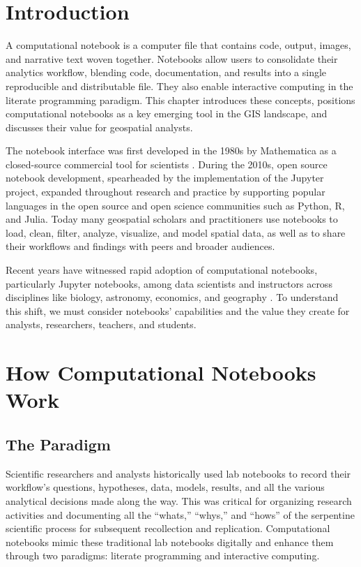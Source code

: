 \documentclass[11pt,letterpaper]{article}
\begin{document}
\section{Introduction}

A computational notebook is a computer file that contains code, output, images, and narrative text woven together. Notebooks allow users to consolidate their analytics workflow, blending code, documentation, and results into a single reproducible and distributable file. They also enable interactive computing in the literate programming paradigm. This chapter introduces these concepts, positions computational notebooks as a key emerging tool in the GIS landscape, and discusses their value for geospatial analysts.

The notebook interface was first developed in the 1980s by Mathematica as a closed-source commercial tool for scientists \citep{somers_scientific_2018}. During the 2010s, open source notebook development, spearheaded by the implementation of the Jupyter project, expanded throughout research and practice by supporting popular languages in the open source and open science communities such as Python, R, and Julia. Today many geospatial scholars and practitioners use notebooks to load, clean, filter, analyze, visualize, and model spatial data, as well as to share their workflows and findings with peers and broader audiences.

Recent years have witnessed rapid adoption of computational notebooks, particularly Jupyter notebooks, among data scientists and instructors across disciplines like biology, astronomy, economics, and geography \citep{perkel_why_2018}. To understand this shift, we must consider notebooks' capabilities and the value they create for analysts, researchers, teachers, and students.

\section{How Computational Notebooks Work}

\subsection{The Paradigm}

Scientific researchers and analysts historically used lab notebooks to record their workflow's questions, hypotheses, data, models, results, and all the various analytical decisions made along the way. This was critical for organizing research activities and documenting all the \enquote{whats,} \enquote{whys,} and \enquote{hows} of the serpentine scientific process for subsequent recollection and replication. Computational notebooks mimic these traditional lab notebooks digitally and enhance them through two paradigms: literate programming and interactive computing.
\end{document}
